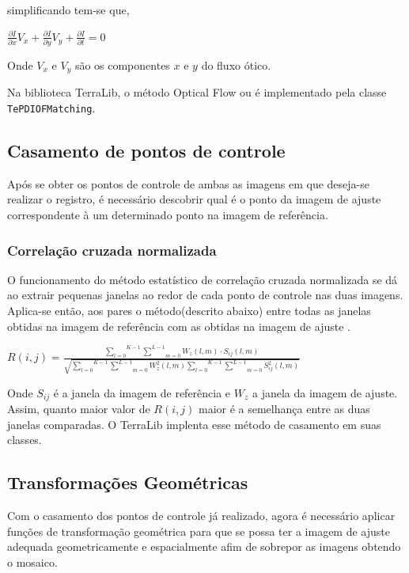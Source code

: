 \documentclass[9pt, a4paper, nofonttune, journal]{IEEEtran}
\begin{document}
simplificando tem-se que,

\begin{center}
$\frac{\partial I}{\partial x}V_x+\frac{\partial I}{\partial y}V_y+\frac{\partial I}{\partial t} = 0$\end{center}

Onde $V_x$ e $V_y$ são os componentes $x$ e $y$ do fluxo ótico.

Na biblioteca TerraLib, o método Optical Flow ou é implementado pela classe \texttt{TePDIOFMatching}.

\subsection{Casamento de pontos de controle}
Após se obter os pontos de controle de ambas as imagens em que deseja-se realizar o registro, é necessário descobrir qual é o ponto da imagem de ajuste correspondente à um determinado ponto na imagem de referência.

\subsubsection{Correlação cruzada normalizada}
O funcionamento do método estatístico de correlação cruzada normalizada se dá ao extrair pequenas janelas ao redor de cada ponto de controle nas duas imagens. Aplica-se então, aos pares o método(descrito abaixo) entre todas as janelas obtidas na imagem de referência com as obtidas na imagem de ajuste \cite{Fedorov1}\cite{Leila1}\cite{Zhao1}.

\begin{center}
$R(i,j)=\frac{\overset{K-1}{\underset{l=0}{\sum}}\underset{m=0}{\overset{L-1}{\sum}}W_{z}(l,m)\cdot S_{ij}(l,m)}{\sqrt{\overset{K-1}{\underset{l=0}{\sum}}\underset{m=0}{\overset{L-1}{\sum}}W_{z}^{2}(l,m)\overset{K-1}{\underset{l=0}{\sum}}\underset{m=0}{\overset{L-1}{\sum}}S_{ij}^{2}(l,m)}}$\end{center}
Onde $S_{ij}$ é a janela da imagem de referência e $W_{z}$ a janela da imagem de ajuste.
Assim, quanto maior valor de $R(i,j)$ maior é a semelhança entre as duas janelas comparadas.
O TerraLib implenta esse método de casamento em suas classes.

\subsection{Transformações Geométricas}
Com o casamento dos pontos de controle já realizado, agora é necessário aplicar funções de transformação geométrica para que se possa ter a imagem de ajuste adequada geometricamente e espacialmente afim de sobrepor as imagens obtendo o mosaico.
\end{document}
